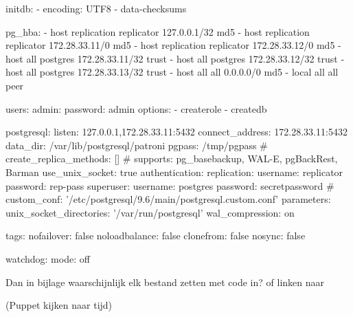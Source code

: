 initdb:
- encoding: UTF8
- data-checksums

pg_hba:
- host replication replicator 127.0.0.1/32 md5
- host replication replicator 172.28.33.11/0 md5
- host replication replicator 172.28.33.12/0 md5
- host all postgres 172.28.33.11/32 trust
- host all postgres 172.28.33.12/32 trust
- host all postgres 172.28.33.13/32 trust
- host all all 0.0.0.0/0 md5
- local all all peer

users:
admin:
password: admin
options:
- createrole
- createdb

postgresql:
listen: 127.0.0.1,172.28.33.11:5432
connect_address: 172.28.33.11:5432
data_dir: /var/lib/postgresql/patroni
pgpass: /tmp/pgpass
#    create_replica_methods: [] # supports: pg_basebackup, WAL-E, pgBackRest, Barman
use_unix_socket: true
authentication:
replication:
username: replicator
password: rep-pass
superuser:
username: postgres
password: secretpassword
#    custom_conf: '/etc/postgresql/9.6/main/postgresql.custom.conf'
parameters:
unix_socket_directories: '/var/run/postgresql'
wal_compression: on

tags:
nofailover: false
noloadbalance: false
clonefrom: false
nosync: false

watchdog:
mode: off



Dan in bijlage waarschijnlijk elk bestand zetten met code in?
of linken naar 




(Puppet kijken naar tijd)

